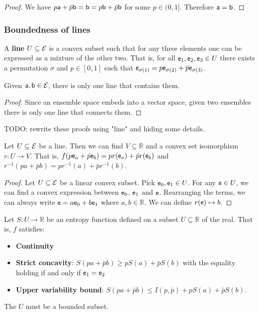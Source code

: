 \begin{proof}
	We have $p\ens[a] + \bar{p} \ens[b] = \ens[b] = p\ens[b] + \bar{p} \ens[b]$ for some $p \in (0,1]$. Therefore $\ens[a] = \ens[b]$.
\end{proof}




\subsubsection{Boundedness of lines}

\begin{defn}
	A \textbf{line} $U \subseteq \Ens$ is a convex subset such that for any three elements one can be expressed as a mixture of the other two. That is, for all $\ens_1, \ens_2, \ens_3 \in U$ there exists a permutation $\sigma$ and $p \in [0,1]$ such that $\ens_{\sigma(1)} = p \ens_{\sigma(2)} + \bar{p} \ens_{\sigma(3)}	$.
\end{defn}

\begin{prop}
	Given $\ens[a], \ens[b] \in \Ens$, there is only one line that contains them.
\end{prop}

\begin{proof}
	Since an ensemble space embeds into a vector space, given two ensembles there is only one line that connects them.
\end{proof}


TODO: rewrite these proofs using "line" and hiding some details.

\begin{prop}
	Let $U \subseteq \Ens$ be a line. Then we can find $V \subseteq \mathbb{R}$ and a convex set isomorphism $r : U \to V$. That is, $f(p \ens_a + \bar{p} \ens_b) = p r(\ens_a) + \bar{p} r(\ens_b)$ and $r^{-1} (p a + \bar{p} b) = p r^{-1} (a) + \bar{p} r^{-1} (b)$.
\end{prop}

\begin{proof}
	Let $U \subseteq \Ens$ be a linear convex subset. Pick $\ens_0, \ens_1 \in U$. For any $\ens \in U$, we can find a convex expression between $\ens_0$, $\ens_1$ and $\ens$. Rearranging the terms, we can always write $\ens = a\ens_0 + b\ens_1$ where $a,b \in \mathbb{R}$. We can define $r(\ens) \mapsto b$.
\end{proof}

\begin{prop}
	Let $S : U \to \mathbb{R}$ be an entropy function defined on a subset $U \subseteq \mathbb{R}$ of the real. That is, $f$ satisfies:
	\begin{itemize}
		\item \textbf{Continuity}
		\item \textbf{Strict concavity}: $S(p a + \bar{p} b) \geq p S(a) + \bar{p} S(b)$ with the equality holding if and only if $\ens_1 = \ens_2$
		\item \textbf{Upper variability bound}: $S(p a + \bar{p} b) \leq I(p, \bar{p}) + p S(a) + \bar{p} S(b)$.
	\end{itemize}
	The $U$ must be a bounded subset.
\end{prop}

